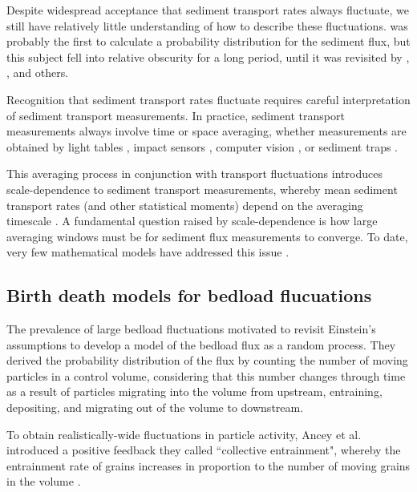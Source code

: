 Despite widespread acceptance that sediment transport rates always fluctuate, we still have relatively little understanding of how to describe these fluctuations.
\citet{Hamamori1962} was probably the first to calculate a probability distribution for the sediment flux, but this subject fell into relative obscurity for a long period, until it was revisited by \citet{Nikora1997}, \citet{Ancey2006}, and others.

Recognition that sediment transport rates fluctuate requires careful interpretation of sediment transport measurements. 
In practice, sediment transport measurements always involve time or space averaging, whether measurements are obtained by light tables \citep{Zimmermann2008, Chartrand2018}, impact sensors \citep{Rickenmann2007, Mendes2016}, computer vision \citep{Roseberry2012, Ancey2014}, or sediment traps \citep{Bunte2004, Papangelakis2016}.

This averaging process in conjunction with transport fluctuations introduces scale-dependence to sediment transport measurements, whereby mean sediment transport rates (and other statistical moments) depend on the averaging timescale \citep{Turowski2010,Campagnol2012,Ancey2020a}.
A fundamental question raised by scale-dependence is how large averaging windows must be for sediment flux measurements to converge.
To date, very few mathematical models have addressed this issue \citep[e.g.][]{Ancey2020a}.

\subsection{Birth death models for bedload flucuations}
\label{sec:birthdeath}
The prevalence of large bedload fluctuations motivated \citet{Ancey2006,Ancey2008} to revisit Einstein's assumptions to develop a model of the bedload flux as a random process.
They derived the probability distribution of the flux by counting the number of moving particles in a control volume, considering that this number changes through time as a result of particles migrating into the volume from upstream, entraining, depositing, and migrating out of the volume to downstream.

To obtain realistically-wide fluctuations in particle activity, Ancey et al. introduced a positive feedback they called ``collective entrainment", whereby the entrainment rate of grains increases in proportion to the number of moving grains in the volume \citep{Ancey2008,Heyman2013}.

